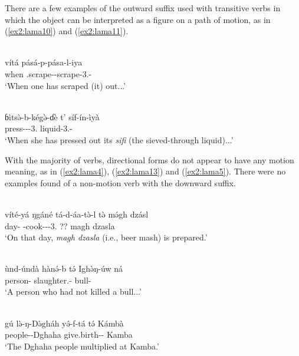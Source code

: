 There are a few examples of the outward suffix used with transitive verbs in which the object can be interpreted as a figure on a path of motion, as in (\ref{ex2:lama10}) and (\ref{ex2:lama11}).

\ea\label{ex2:lama10}
 \\
\gll 
vítá pásá-p-pása-l-iya	\\
when .scrape--scrape-3.-	\\
\glt `When one has scraped (it) out...'
\z 

\ea\label{ex2:lama11}
 \\
\gll
ɓìtsə̀-b-kégə̀-ɗè t’ síf-ín-ìyà	\\
press---3.  liquid-3.-		\\
\glt `When she has pressed out its \textit{sifi} (the sieved-through liquid)...'
\z

With the majority of verbs, directional forms do not appear to have any motion meaning, as in (\ref{ex2:lama4}), (\ref{ex2:lama13}) and (\ref{ex2:lama5}). There were no examples found of a non-motion verb with the downward suffix.

\ea\label{ex2:lama4}
 \\
\gll 
víté-yá ŋgáné tá-d-áa-tə̀-l tə̀ {mə́gh dzásl}	 \\
day-  -cook---3. ?? {magh dzasla}	\\
\glt `On that day, \textit{magh dzasla} (i.e., beer mash) is prepared.'
\z

\ea\label{ex2:lama13}
 \\
\gll 
ùnd-úndà hànə́-b tə́ Ighə̀ŋ-úw ná	\\
person- slaughter.-  bull- 		\\ 
\glt `A person who had not killed a bull...'
\z

\ea\label{ex2:lama5}
 \\
\gll 
gú lə̀-ŋ-Də̀gháh yə́-f-tá tə́ Kámbà	\\
 people--Dghaha give.birth--  Kamba		\\
\glt `The Dghaha people multiplied at Kamba.'
\z 

